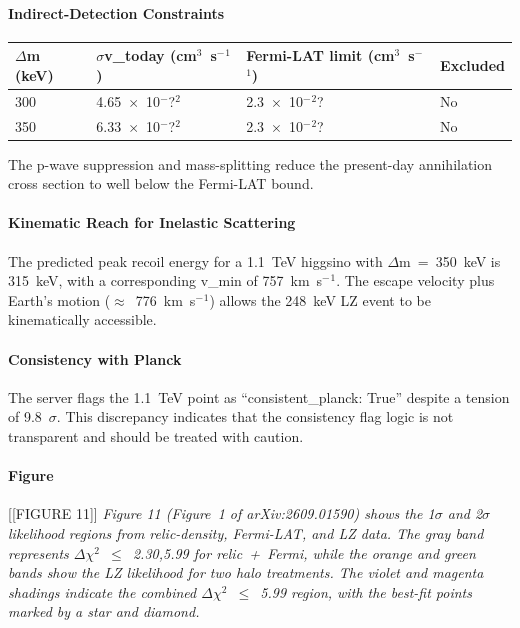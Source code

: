 \documentclass[11pt,a4paper]{article}
\begin{document}
\paragraph{Indirect-Detection Constraints}
\begin{longtable}{@{}p{}p{}p{}p{}@{}}
\toprule
\textbf{$\Delta$m (keV)} & \textbf{$\sigma$v\_today (cm$^3$~s$^-$$^1$)} & \textbf{Fermi-LAT limit (cm$^3$~s$^-$$^1$)} & \textbf{Excluded} \\ \midrule \endhead
300 & 4.65~$\times$~10$^-$?$^2$ & 2.3~$\times$~10$^-$$^2$? & No \\
350 & 6.33~$\times$~10$^-$?$^2$ & 2.3~$\times$~10$^-$$^2$? & No \\
\bottomrule\end{longtable}
The p-wave suppression and mass-splitting reduce the present-day annihilation cross section to well below the Fermi-LAT bound.

\paragraph{Kinematic Reach for Inelastic Scattering}
The predicted peak recoil energy for a 1.1~TeV higgsino with $\Delta$m~=~350~keV is 315~keV, with a corresponding v\_min of 757~km~s$^-$$^1$.  The escape velocity plus Earth's motion ($\approx$~776~km~s$^-$$^1$) allows the 248~keV LZ event to be kinematically accessible.

\paragraph{Consistency with Planck}
The server flags the 1.1~TeV point as ``consistent\_planck: True'' despite a tension of 9.8~$\sigma$.  This discrepancy indicates that the consistency flag logic is not transparent and should be treated with caution.

\paragraph{Figure}
[[FIGURE 11]] \textit{Figure 11 (Figure~1 of arXiv:2609.01590) shows the 1$\sigma$ and 2$\sigma$ likelihood regions from relic-density, Fermi-LAT, and LZ data.  The gray band represents $\Delta$$\chi$$^2$~$\leq$~2.30,5.99 for relic~+~Fermi, while the orange and green bands show the LZ likelihood for two halo treatments.  The violet and magenta shadings indicate the combined $\Delta$$\chi$$^2$~$\leq$~5.99 region, with the best-fit points marked by a star and diamond.}
\end{document}
